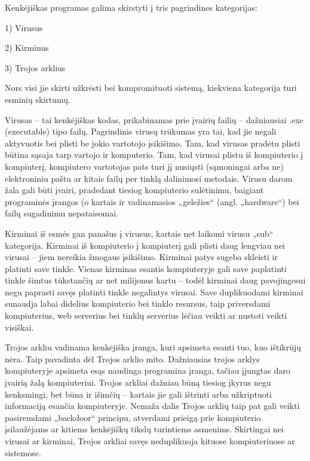 Kenkėjiškas programas galima skirstyti į tris pagrindines kategorijas:

1) Virusus

2) Kirminus

3) Trojos arklius

Nors visi jie skirti užkrėsti bei kompromituoti sistemą, kiekviena kategorija turi esminių skirtumų.

Virusas – tai kenkėjiškas kodas, prikabinamas prie įvairių failių – dažniausiai .exe (executable) tipo failų. Pagrindinis virusų trūkumas yra tai, kad jie negali aktyvuotis bei plisti be jokio vartotojo įsikišimo. Tam, kad virusas pradėtu plisti būtina sąsaja tarp vartojo ir komputerio. Tam, kad virusai plistu iš kompiuterio į kompiuterį, kompiutero vartotojas pats turi jį nusiųsti (sąmoningai arba ne) elektroniniu paštu ar kitais failų per tinklą dalinimosi metodais. Virusu darom žala gali būti įvairi, pradedant tiesiog kompiuterio sulėtinimu, baigiant programinės įrangos (o kartais ir vadinamasios „geležies“ (angl. „hardware“) bei failų sugadinimu nepataisomai. 

Kirminai iš esmės gan panašus į virusus, kartais net laikomi virusu „sub“ kategorija. Kirminai iš kompiuterio į kompiuterį gali plisti daug lengviau nei virusai – jiem nereikia žmogaus įsikišimo. Kirminai patys sugeba skleisti ir platinti save tinkle. Vienas kirminas esantis kompiuteryje gali save paplatinti tinkle šimtus tūkstančių ar net milijonus kartu – todėl kirminai daug pavojingesni negu paprasti savęs platinti tinkle negalintys virusai. Save duplikuodami kirminai sunaudja labai didelius kompiuterio bei tinklo resursus, taip priversdami kompiuterius, web serverius bei tinklų serverius lėčiau veikti ar nustoti veikti visiškai. 

Trojos arkliu vadinama kenkėjiška įranga, kuri apsimeta esanti tuo, kuo ištikrūjų nėra. Taip pavadinta dėl Trojos arklio mito. Dažniausias trojos arklys kompiuteryje apsimeta esąs naudinga programina įranga, tačiau įjungtas daro įvairią žalą kompiuteriui. Trojos arkliai dažniau būną tiesiog įkyrus negu kenksmingi,  bet būna ir išimčių – kartais jie gali ištrinti arba užkriptuoti informaciją esančia kompiuteryje. Nemaža dalis Trojos arklių taip pat gali veikti pasiremdami „backdoor“ principu, atverdami prieigą prie kompiuterio įsilaužėjams ar kitiems kenkėjiškų tikslų turintiems asmenims. Skirtingai nei virusai ar kirminai, Trojos arkliai savęs neduplikuoja kituose kompiuteriuose ar sistemose.